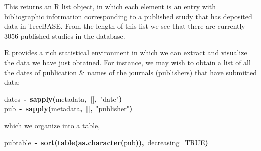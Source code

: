 \documentclass[authoryear, preprint]{elsarticle}
\makeatletter
\newcommand{\hlnumber}[1]{\textcolor[rgb]{0,0,0}{#1}}%
\newcommand{\hlfunctioncall}[1]{\textcolor[rgb]{.5,0,.33}{\textbf{#1}}}%
\newcommand{\hlstring}[1]{\textcolor[rgb]{.6,.6,1}{#1}}%
\newcommand{\hlkeyword}[1]{\textbf{#1}}%
\newcommand{\hlargument}[1]{\textcolor[rgb]{.69,.25,.02}{#1}}%
\newcommand{\hlassignement}[1]{\textbf{#1}}%
\newcommand{\hlsymbol}[1]{#1}%
\newcommand{\hlstd}[1]{\textcolor[rgb]{0,0,0}{#1}}%
\newenvironment{kframe}{%
 \def\FrameCommand##1{\hskip\@totalleftmargin \hskip-\fboxsep
 \colorbox{shadecolor}{##1}\hskip-\fboxsep
     \hskip-\linewidth \hskip-\@totalleftmargin \hskip\columnwidth}%
 \MakeFramed {\advance\hsize-\width
   \@totalleftmargin\z@ \linewidth\hsize
   \@setminipage}}%
 {\par\unskip\endMakeFramed}
\newenvironment{knitrout}{}{} %
\makeatother
\begin{document}
This returns an R list object, in which each element is an entry with bibliographic information corresponding to a published study that has deposited data in TreeBASE.  From the length of this list we see that there are currently 3056 published studies in the database.  

R provides a rich statistical environment in which we can extract and visualize the data we have just obtained. 
For instance, we may wish to obtain a list of all the dates of publication \& names of the journals (publishers) that have submitted data:
\begin{knitrout}
\color{fgcolor}\begin{kframe}
\begin{flushleft}
\ttfamily\noindent
\hlsymbol{dates}{\ }\hlassignement{\usebox{\hlnormalsizeboxlessthan}-}{\ }\hlfunctioncall{sapply}\hlkeyword{(}\hlsymbol{metadata}\hlkeyword{,}{\ }\hlsymbol{\usebox{\hlnormalsizeboxbacktick}[[\usebox{\hlnormalsizeboxbacktick}}\hlkeyword{,}{\ }\hlstring{"{}date"{}}\hlkeyword{)}\hspace*{\fill}\\
\hlstd{}\hlsymbol{pub}{\ }\hlassignement{\usebox{\hlnormalsizeboxlessthan}-}{\ }\hlfunctioncall{sapply}\hlkeyword{(}\hlsymbol{metadata}\hlkeyword{,}{\ }\hlsymbol{\usebox{\hlnormalsizeboxbacktick}[[\usebox{\hlnormalsizeboxbacktick}}\hlkeyword{,}{\ }\hlstring{"{}publisher"{}}\hlkeyword{)}\mbox{}
\normalfont
\end{flushleft}
\end{kframe}
\end{knitrout}

which we organize into a table,
\begin{knitrout}
\color{fgcolor}\begin{kframe}
\begin{flushleft}
\ttfamily\noindent
\hlsymbol{pub\usebox{\hlnormalsizeboxunderscore}table}{\ }\hlassignement{\usebox{\hlnormalsizeboxlessthan}-}{\ }\hlfunctioncall{sort}\hlkeyword{(}\hlfunctioncall{table}\hlkeyword{(}\hlfunctioncall{as.character}\hlkeyword{(}\hlsymbol{pub}\hlkeyword{)}\hlkeyword{)}\hlkeyword{,}{\ }\hlargument{decreasing}\hlargument{=}\hlnumber{TRUE}\hlkeyword{)}\mbox{}
\normalfont
\end{flushleft}
\end{kframe}
\end{knitrout}
\end{document}
